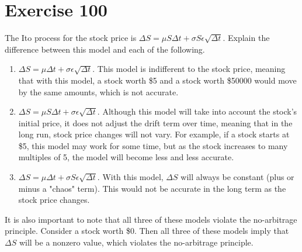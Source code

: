 \documentclass{article}
\begin{document}
\section*{Exercise 100}
\begin{flushleft}
    The Ito process for the stock price is $\Delta S = \mu S \Delta t + \sigma S \epsilon \sqrt{\Delta t}$. Explain the difference between this model and each of the following.
    \begin{enumerate}
        \item $\Delta S = \mu \Delta t + \sigma \epsilon \sqrt{\Delta t}$. This model is indifferent to the stock price, meaning that with this model, a stock worth \$5 and a stock worth \$50000 would move by the same amounts, which is not accurate.
        \item $\Delta S = \mu S \Delta t + \sigma \epsilon \sqrt{\Delta t}$. Although this model will take into account the stock's initial price, it does not adjust the drift term over time, meaning that in the long run, stock price changes will not vary. For example, if a stock starts at \$5, this model may work for some time, but as the stock increases to many multiples of 5, the model will become less and less accurate.
        \item $\Delta S = \mu \Delta t + \sigma S \epsilon \sqrt{\Delta t}$. With this model, $\Delta S$ will always be constant (plus or minus a "chaos" term). This would not be accurate in the long term as the stock price changes.
    \end{enumerate}
    It is also important to note that all three of these models violate the no-arbitrage principle. Consider a stock worth \$0. Then all three of these models imply that $\Delta S$ will be a nonzero value, which violates the no-arbitrage principle.
\end{flushleft}
\end{document}
